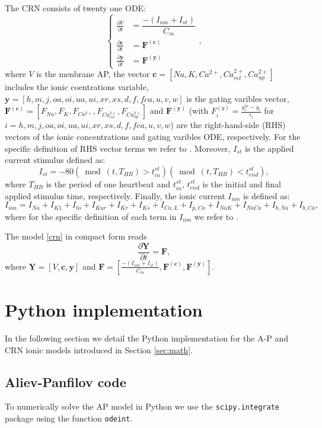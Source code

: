 \documentclass[11pt,a4paper]{article}
\begin{document}
The CRN consists of twenty one ODE:
\begin{equation}
\label{crn}
\begin{cases}
\tfrac{\partial V}{\partial t} &= \dfrac{-(I_{ion}+I_{st})}{C_m} \\
\tfrac{\partial \mathbf{c}}{\partial t} &= \mathbf{F^{(c)}} \\
\tfrac{\partial \mathbf{y}}{\partial t} &= \mathbf{F^{(y)}}
\end{cases},
\end{equation}
where $V$ is the menbrane AP, the vector $\mathbf{c}=[Na, K, Ca^{2+}, Ca^{2+}_{rel}, Ca^{2+}_{up}]$ includes the ionic coentrations variable, $\mathbf{y}=[h, m, j, oa, oi, ua, ui, xr, xs, d, f, fca, u, v, w]$ is the gating varibles vector, $\mathbf{F^{(c)}}=[F_{Na}, F_{K}, F_{Ca^{2+}}, F_{Ca^{2+}_{rel}}, F_{Ca^{2+}_{up}}]$ and $\mathbf{F^{(y)}}$ (with $F_i^{(y)}=\tfrac{y_i^{\infty}-y_i}{\tau_i}$ for $i=h, m, j, oa, oi, ua, ui, xr, xs, d, f, fca, u, v, w$) are the right-hand-side (RHS) vectors of the ionic concentrations and gating varibles ODE, respectively. For the specific definition of RHS vector terms we refer to \cite{courtemanche1998ionic}. Moreover, $I_{st}$ is the applied current stimulus defined as:
$$I_{st} = -80 (\bmod(t,T_{HB}) > t^{st}_{in}) (\bmod(t,T_{HB}) < t^{st}_{end}),$$
where $T_{HB}$ is the period of one heartbeat and $t^{st}_{in}$, $t^{st}_{end}$ is the initial and final applied stimulus time, respectively. Finally, the ionic current $I_{ion}$ is defined as: 
$$I_{ion}=I_{Na}+I_{K1}+I_{to}+I_{Kur}+I_{Kr}+I_{Ks}+I_{Ca,L}+I_{p,Ca}+I_{NaK}+I_{NaCa}+I_{b,Na}+I_{b,Ca},$$
where for the specific definition of each term in $I_{ion}$ we refer to \cite{courtemanche1998ionic}. 

\noindent
The model \eqref{crn} in compact form reads
\begin{equation}
\label{crn_compact}
\dfrac{\partial \mathbf{Y}}{\partial t} = \mathbf{F},
\end{equation}
where $\mathbf{Y}=[V,\mathbf{c},\mathbf{y}]$ and $\mathbf{F}=\left[ \tfrac{-(I_{ion}+I_{st})}{C_m}, \mathbf{F^{(c)}}, \mathbf{F^{(y)}} \right]$.

\section{Python implementation}\label{sec:python}
In the following section we detail the Python implementation for the A-P and CRN ionic models introduced in Section \ref{sec:math}. 

\subsection{Aliev-Panfilov code}\label{subsec:python_ap}
To numerically solve the AP model in Python we use the \verb|scipy.integrate| package using the function \verb|odeint|.
\end{document}
